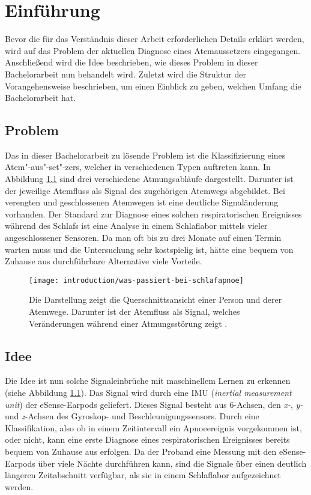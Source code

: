 
\chapter{Einführung}
\label{ch:Introduction}
Bevor die für das Verständnis dieser Arbeit erforderlichen Details erklärt werden, wird auf das Problem der aktuellen Diagnose eines Atemaussetzers eingegangen. 
Anschließend wird die Idee beschrieben, wie dieses Problem in dieser Bachelorarbeit nun behandelt wird.
Zuletzt wird die Struktur der Vorangehensweise beschrieben, um einen Einblick zu geben, welchen Umfang die Bachelorarbeit hat.

\section{Problem}
Das in dieser Bachelorarbeit zu lösende Problem ist die Klassifizierung eines Atem"-aus"-set"-zers, welcher in verschiedenen Typen auftreten kann. 
In Abbildung \ref{introduction:problem_description} sind drei verschiedene Atmungsabläufe dargestellt. 
Darunter ist der jeweilige Atemfluss als Signal des zugehörigen Atemwegs abgebildet.
Bei verengten und geschlossenen Atemwegen ist eine deutliche Signaländerung vorhanden. 
Der Standard zur Diagnose eines solchen respiratorischen Ereignisses während des Schlafs ist eine Analyse in einem Schlaflabor mittels vieler angeschlossener Sensoren. 
Da man oft bis zu drei Monate auf einen Termin warten muss und die Untersuchung sehr kostspielig ist, hätte eine bequem von Zuhause aus durchführbare Alternative viele Vorteile.


\begin{figure}[h]
  \centering
  \texttt{[image: introduction/was-passiert-bei-schlafapnoe]}  
  \caption{Die Darstellung zeigt die Querschnittsansicht einer Person und derer Atemwege. Darunter ist der Atemfluss als Signal, welches Veränderungen während einer Atmungsstörung zeigt \cite{DeutscheFamilienversicherungSchlafapnoesyndrom}.}
  \label{introduction:problem_description}
\end{figure}

\newpage

\section{Idee}
Die Idee ist nun solche Signaleinbrüche mit maschinellem Lernen zu erkennen (siehe Abbildung \ref{introduction:problem_description}). 
Das Signal wird durch eine IMU (\textit{inertial measurement unit}) der eSense-Earpods geliefert.
Dieses Signal besteht aus 6-Achsen, den \textit{x-}, \textit{y-} und \textit{z}-Achsen des Gyroskop- und Beschleunigungssensors.
Durch eine Klassifikation, also ob in einem Zeitintervall ein Apnoeereignis vorgekommen ist, oder nicht, kann eine erste Diagnose eines respiratorischen Ereignisses bereits bequem von Zuhause aus erfolgen.
Da der Proband eine Messung mit den eSense-Earpods über viele Nächte durchführen kann, sind die Signale über einen deutlich längeren Zeitabschnitt verfügbar, als sie in einem Schlaflabor aufgezeichnet werden.

